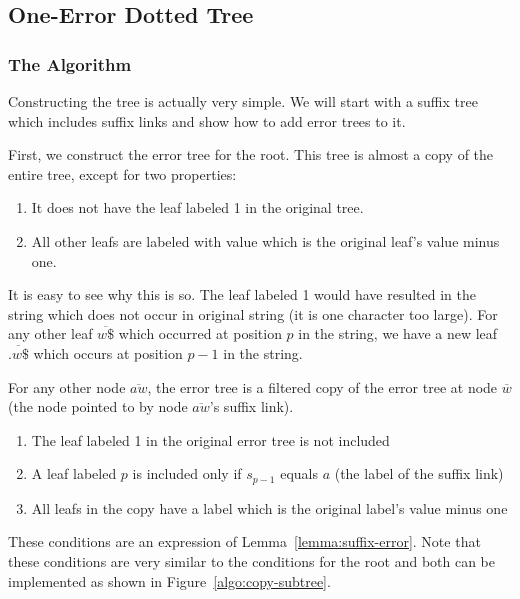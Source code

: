 \subsection{One-Error Dotted Tree}
\subsubsection{The Algorithm}

Constructing the tree is actually very simple. We will start with a suffix tree which includes suffix links and show how to add error trees to it.

First, we construct the error tree for the root. This tree is almost a copy of the entire tree, except for two properties:

\begin{enumerate}
\item It does not have the leaf labeled 1 in the original tree.
\item All other leafs are labeled with value which is the original leaf's value minus one.
\end{enumerate}

It is easy to see why this is so. The leaf labeled 1 would have resulted in the string  which does not occur in original string (it is one character too large). For any other leaf $\overline{w\$}$ which occurred at position $p$ in the string, we have a new leaf $\overline{.w\$}$ which occurs at position $p-1$ in the string.

For any other node $\overline{aw}$, the error tree is a filtered copy of the error tree at node $\overline{w}$ (the node pointed to by node $\overline{aw}$'s suffix link).

\begin{enumerate}
\item The leaf labeled 1 in the original error tree is not included
\item A leaf labeled $p$ is included only if $s_{p-1}$ equals $a$ (the label of the suffix link)
\item All leafs in the copy have a label which is the original label's value minus one
\end{enumerate}

These conditions are an expression of Lemma~\ref{lemma:suffix-error}.
Note that these conditions are very similar to the conditions for the root and both can be implemented as shown in Figure~\ref{algo:copy-subtree}.



